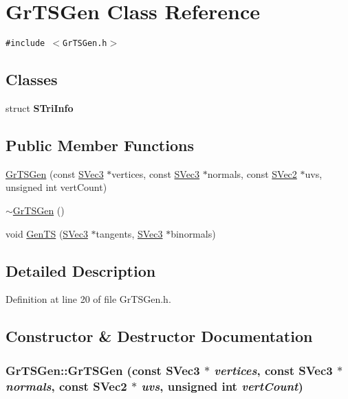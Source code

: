 \hypertarget{class_gr_t_s_gen}{
\section{GrTSGen Class Reference}
\label{class_gr_t_s_gen}
}
{\tt \#include $<$GrTSGen.h$>$}

\subsection*{Classes}
\begin{CompactItemize}
\item 
struct \textbf{STriInfo}
\end{CompactItemize}
\subsection*{Public Member Functions}
\begin{CompactItemize}
\item 
\hyperlink{class_gr_t_s_gen_f1592efe5c840cc47b2e39617ae8e01b}{GrTSGen} (const \hyperlink{struct_s_vec3}{SVec3} $\ast$vertices, const \hyperlink{struct_s_vec3}{SVec3} $\ast$normals, const \hyperlink{struct_s_vec2}{SVec2} $\ast$uvs, unsigned int vertCount)
\item 
\hyperlink{class_gr_t_s_gen_ebfb1071b62919c32268d627000d232c}{$\sim$GrTSGen} ()
\item 
void \hyperlink{class_gr_t_s_gen_785ea2f7c4d37485f83c5de4e6de5306}{GenTS} (\hyperlink{struct_s_vec3}{SVec3} $\ast$tangents, \hyperlink{struct_s_vec3}{SVec3} $\ast$binormals)
\end{CompactItemize}


\subsection{Detailed Description}


Definition at line 20 of file GrTSGen.h.

\subsection{Constructor \& Destructor Documentation}
\hypertarget{class_gr_t_s_gen_f1592efe5c840cc47b2e39617ae8e01b}{
\subsubsection[{GrTSGen}]{\setlength{\rightskip}{0pt plus 5cm}GrTSGen::GrTSGen (const {\bf SVec3} $\ast$ {\em vertices}, \/  const {\bf SVec3} $\ast$ {\em normals}, \/  const {\bf SVec2} $\ast$ {\em uvs}, \/  unsigned int {\em vertCount})}}
\label{class_gr_t_s_gen_f1592efe5c840cc47b2e39617ae8e01b}




